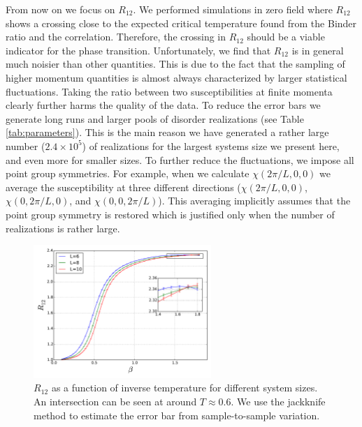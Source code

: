 From now on we focus on $R_{12}$. We performed simulations in zero field
where $R_{12}$ shows a crossing close to the expected critical temperature found from
the Binder ratio and the correlation. Therefore, the crossing in $R_{12}$ should 
be a viable indicator for the phase transition. Unfortunately, we find that $R_{12}$ is in 
general much noisier than other quantities. This is due to the fact that the sampling 
of higher momentum quantities is almost always characterized by larger statistical 
fluctuations. Taking the ratio between two susceptibilities at finite momenta clearly further
harms the quality of the data. To reduce the error bars we generate long runs and larger 
pools of disorder realizations (see Table \ref{tab:parameters}). This is the main reason we have generated a rather large number ($2.4 \times 10^5$) of realizations 
for the largest systems size we present here, and even more for smaller sizes. To further reduce the 
fluctuations, we impose all point group symmetries. For example, when we calculate 
$\chi(2\pi/L,0,0)$ we average the susceptibility at three different directions 
($\chi(2\pi/L,0,0)$, $\chi(0,2\pi/L,0)$, and $\chi(0,0,2\pi/L)$). This averaging implicitly assumes 
that the point group symmetry is restored which is justified only when the number of realizations
is rather large. 
 
\begin{figure}[ht]
\centering

\includegraphics[width=0.6\textwidth]{img/r12.pdf}%
\caption{\label{fig:r12} $R_{12}$ as a function of inverse temperature for different system sizes. 
An intersection can be seen at around $T \approx 0.6$. We use the jackknife method to estimate 
the error bar from sample-to-sample variation.  
}
\end{figure}

